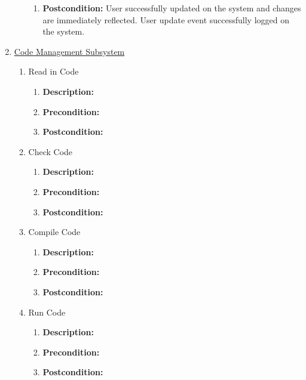 \documentclass{article}
\begin{document}
\begin{enumerate}
\begin{enumerate}
\begin{enumerate}
			\item \textbf{Postcondition:} User successfully updated on the system and changes are immediately reflected. User update event successfully logged on the system.
\newline
		\end{enumerate}
	\end{enumerate}
	
	
	\item \underline{Code Management Subsystem}
    \begin{enumerate}
    	\item Read in Code
		\begin{enumerate}
			\item \textbf{Description:} 
			\item \textbf{Precondition:}
			\item \textbf{Postcondition:}\newline
		\end{enumerate}
        
        \item Check Code
		\begin{enumerate}
			\item \textbf{Description:} 
			\item \textbf{Precondition:}
			\item \textbf{Postcondition:}\newline
		\end{enumerate}
        
        \item Compile Code
		\begin{enumerate}
			\item \textbf{Description:} 
			\item \textbf{Precondition:}
			\item \textbf{Postcondition:}\newline
		\end{enumerate}
        
        \item Run Code
		\begin{enumerate}
			\item \textbf{Description:} 
			\item \textbf{Precondition:}
			\item \textbf{Postcondition:}\newline
		\end{enumerate}
        
   \end{enumerate}
        

\end{enumerate}
\end{document}
